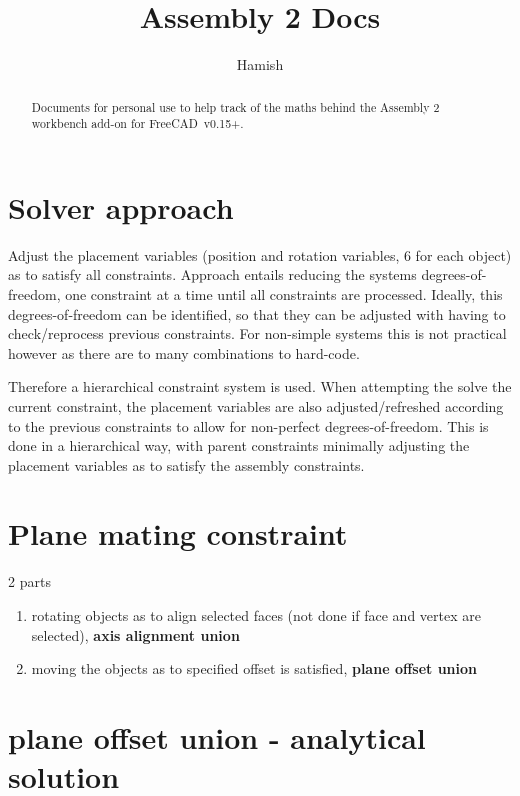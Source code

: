 \documentclass[a4paper,10pt]{article}
\title{Assembly 2 Docs }
\author{Hamish}
\begin{document}
\maketitle

\begin{abstract}

Documents for personal use to help track of the maths behind the Assembly 2 workbench add-on for FreeCAD~v0.15+.

\end{abstract}

\tableofcontents




\section{Solver approach}

Adjust the placement variables (position and rotation variables, 6 for each object) as to satisfy all constraints.
Approach entails reducing the systems degrees-of-freedom, one constraint at a time until all constraints are processed.
Ideally, this degrees-of-freedom can be identified, so that they can be adjusted with having to check/reprocess previous constraints.
For non-simple systems this is not practical however as there are to many combinations to hard-code.

Therefore a hierarchical constraint system is used.
When attempting the solve the current constraint, the placement variables are also adjusted/refreshed according to the previous constraints to allow for non-perfect degrees-of-freedom.
This is done in a hierarchical way, with parent constraints minimally adjusting the placement variables as to satisfy the assembly constraints.

\section{Plane mating constraint}

2 parts 
\begin{enumerate}
 \item rotating objects as to align selected faces (not done if face and vertex are selected), \textbf{axis alignment union}
 \item moving the objects as to specified offset is satisfied, \textbf{plane offset union}
\end{enumerate}


\section{plane offset union - analytical solution}
\end{document}
